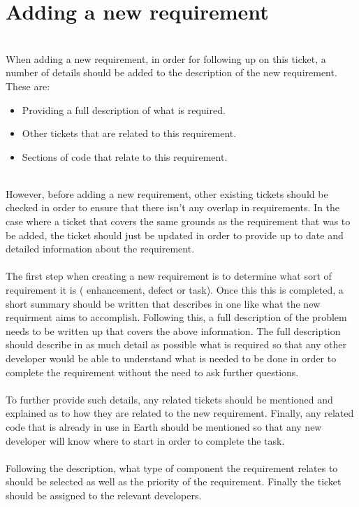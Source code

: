 \documentclass{article}
\begin{document}
\section{Adding a new requirement}
\\
When adding a new requirement, in order for following up on this ticket, a number of details should be added to the description of the new requirement. These are:
\begin{itemize}
\item Providing a full description of what is required.
\item Other tickets that are related to this requirement.
\item Sections of code that relate to this requirement.
\end{itemize}
\\
However, before adding a new requirement, other existing tickets should be checked in order to ensure that there isn't any overlap in requirements. In the case where a ticket that covers the same grounds as the requirement that was to be added, the ticket should just be updated in order to provide up to date and detailed information about the requirement.\\
\\
The first step when creating a new requirement is to determine what sort of requirement it is ( enhancement, defect or task). Once this this is completed, a short summary should be written that describes in one like what the new requirment aims to accomplish. Following this, a full description of the problem needs to be written up that covers the above information. The full description should describe in as much detail as possible what is required so that any other developer would be able to understand what is needed to be done in order to complete the requirement without the need to ask further questions.\\
\\
To further provide such details, any related tickets should be mentioned and explained as to how they are related to the new requirement. Finally, any related code that is already in use in Earth should be mentioned so that any new developer will know where to start in order to complete the task.\\
\\
Following the description, what type of component the requirement relates to should be selected as well as the priority of the requirement. Finally the ticket should be assigned to the relevant developers.\\
\end{document}
